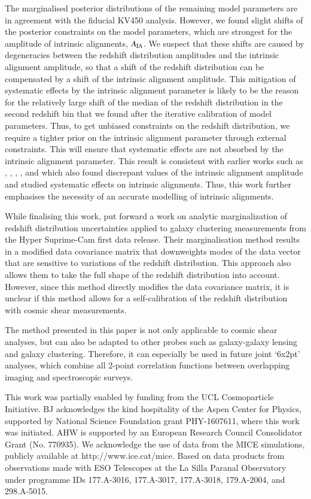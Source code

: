 \documentclass{aa}
\begin{document}
The marginalised posterior distributions of the remaining model parameters are in agreement with the fiducial KV450 analysis. However, we found slight shifts of the posterior constraints on the model parameters, which are strongest for the amplitude of intrinsic alignments, $A_{\rm IA}$. We suspect that these shifts are caused by degeneracies between the redshift distribution amplitudes and the intrinsic alignment amplitude, so that a shift of the redshift distribution can be compensated by a shift of the intrinsic alignment amplitude. This mitigation of systematic effects by the intrinsic alignment parameter is likely to be the reason for the relatively large shift of the median of the redshift distribution in the second redshift bin that we found after the iterative calibration of model parameters. Thus, to get unbiased constraints on the redshift distribution, we require a tighter prior on the intrinsic alignment parameter through external constraints. This will ensure that systematic effects are not absorbed by the intrinsic alignment parameter. This result is consistent with earlier works such as \cite{wright_som_kv450}, \cite{hildebrandt18}, \cite{fortuna20}, \cite{vanUitert18}, and \cite{Efstathiou18} which also found discrepant values of the intrinsic alignment amplitude and studied systematic effects on intrinsic alignments. Thus, this work further emphasises the necessity of an accurate modelling of intrinsic alignments.

While finalising this work, \cite{Hadzhiyska20} put forward a work on analytic marginalization of redshift distribution uncertainties applied to galaxy clustering measurements from the Hyper Suprime-Cam first data release. Their marginalisation method results in a modified data covariance matrix that downweights modes of the data vector that are sensitive to variations of the redshift distribution. This approach also allows them to take the full shape of the redshift distribution into account. However, since this method directly modifies the data covariance matrix, it is unclear if this method allows for a self-calibration of the redshift distribution with cosmic shear measurements. 

The method presented in this paper is not only applicable to cosmic shear analyses, but can also be adapted to other probes such as galaxy-galaxy lensing and galaxy clustering. Therefore, it can especially be used in future joint `6x2pt' analyses, which combine all 2-point correlation functions between overlapping imaging and spectroscopic surveys.
\begin{acknowledgements}
This work was partially enabled by funding from the UCL Cosmoparticle Initiative.
BJ acknowledges the kind hospitality of the Aspen Center for Physics, supported by National Science Foundation grant PHY-1607611, where this work was initiated.
AHW is supported by an European Research Council Consolidator Grant (No. 770935).
We acknowledge the use of data from the MICE simulations, publicly available at http://www.ice.cat/mice.
Based on data products from observations made with ESO Telescopes at the La Silla Paranal Observatory under programme IDs 177.A-3016, 177.A-3017, 177.A-3018, 179.A-2004, and 298.A-5015.
\end{acknowledgements}
\end{document}
